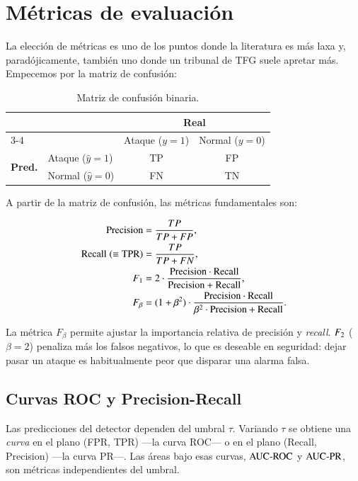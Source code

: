 \section{Métricas de evaluación}
\label{sec:teo-metricas}

La elección de métricas es uno de los puntos donde la literatura es más laxa y, paradójicamente, también uno donde un tribunal de TFG suele apretar más. Empecemos por la matriz de confusión:

\begin{table}[H]
\centering
\small
\begin{tabular}{ll cc}
\toprule
 & & \multicolumn{2}{c}{\textbf{Real}} \\
\cmidrule(lr){3-4}
 & & Ataque ($y=1$) & Normal ($y=0$) \\
\midrule
\multirow{2}{*}{\textbf{Pred.}} & Ataque ($\hat y=1$) & TP & FP \\
                                 & Normal ($\hat y=0$) & FN & TN \\
\bottomrule
\end{tabular}
\caption{Matriz de confusión binaria.}
\label{tab:cm}
\end{table}

A partir de la matriz de confusión, las métricas fundamentales son:

\begin{align}
\text{Precision} &= \frac{TP}{TP + FP}, \label{eq:precision} \\
\text{Recall} \;(\equiv \mathrm{TPR}) &= \frac{TP}{TP + FN}, \label{eq:recall} \\
F_{1} &= 2 \cdot \frac{\text{Precision} \cdot \text{Recall}}{\text{Precision} + \text{Recall}}, \label{eq:f1} \\
F_\beta &= (1 + \beta^2) \cdot \frac{\text{Precision} \cdot \text{Recall}}{\beta^2 \cdot \text{Precision} + \text{Recall}}. \label{eq:fbeta}
\end{align}

La métrica $F_\beta$ permite ajustar la importancia relativa de precisión y \textit{recall}. $F_{2}$ ($\beta=2$) penaliza más los falsos negativos, lo que es deseable en seguridad: dejar pasar un ataque es habitualmente peor que disparar una alarma falsa.

\subsection{Curvas ROC y Precision-Recall}

Las predicciones del detector dependen del umbral $\tau$. Variando $\tau$ se obtiene una \emph{curva} en el plano (FPR, TPR) ---la curva ROC--- o en el plano (Recall, Precision) ---la curva PR---. Las áreas bajo esas curvas, $\text{AUC-ROC}$ y $\text{AUC-PR}$, son métricas independientes del umbral.

